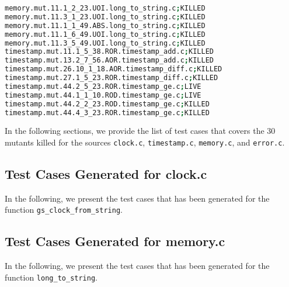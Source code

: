 \begin{lstlisting}[language=bash, label=statuses, caption=Mutants statuses.]
memory.mut.11.1_2_23.UOI.long_to_string.c;KILLED
memory.mut.11.3_1_23.UOI.long_to_string.c;KILLED
memory.mut.11.1_1_49.ABS.long_to_string.c;KILLED
memory.mut.11.1_6_49.UOI.long_to_string.c;KILLED
memory.mut.11.3_5_49.UOI.long_to_string.c;KILLED
timestamp.mut.11.1_5_38.ROR.timestamp_add.c;KILLED
timestamp.mut.13.2_7_56.AOR.timestamp_add.c;KILLED
timestamp.mut.26.10_1_18.AOR.timestamp_diff.c;KILLED
timestamp.mut.27.1_5_23.ROR.timestamp_diff.c;KILLED
timestamp.mut.44.2_5_23.ROR.timestamp_ge.c;LIVE
timestamp.mut.44.1_1_10.ROD.timestamp_ge.c;LIVE
timestamp.mut.44.2_2_23.ROD.timestamp_ge.c;KILLED
timestamp.mut.44.4_3_23.ROR.timestamp_ge.c;KILLED
\end{lstlisting}

In the following sections, we provide the list of test cases that covers the 30 mutants killed for the sources \texttt{clock.c}, \texttt{timestamp.c}, \texttt{memory.c}, and \texttt{error.c}.

\newpage
\subsection{Test Cases Generated for clock.c}

In the following, we present the test cases that has been generated for the function \texttt{gs\_clock\_from\_string}.





\newpage
\subsection{Test Cases Generated for memory.c}

In the following, we present the test cases that has been generated for the function \texttt{long\_to\_string}.


